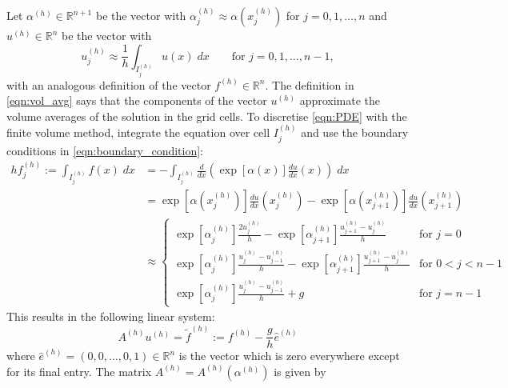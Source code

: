\documentclass[11pt]{article}
\begin{document}
Let $\alpha^{(h)}\in\mathbb{R}^{n+1}$ be the vector with $\alpha^{(h)}_j\approx \alpha(x^{(h)}_j)$ for $j=0,1,\dots,n$ and $u^{(h)}\in\mathbb{R}^{n}$ be the vector with
\begin{equation}
    u^{(h)}_j\approx \frac{1}{h}\int_{I^{(h)}_j} u(x)\; dx\qquad\text{for $j=0,1,\dots,n-1$},\label{eqn:vol_avg}
\end{equation}
with an analogous definition of the vector $f^{(h)}\in \mathbb{R}^n$. The definition in \eqref{eqn:vol_avg} says that the components of the vector $u^{(h)}$ approximate the volume averages of the solution in the grid cells. To discretise \eqref{eqn:PDE} with the finite volume method, integrate the equation over cell $I_j^{(h)}$ and use the boundary conditions in \eqref{eqn:boundary_condition}:
\begin{equation}
    \begin{aligned}
       hf^{(h)}_j :=\int_{I^{(h)}_j} f(x)\;dx&=
    -\int_{I^{(h)}_j} \frac{d}{dx}\left(\exp[\alpha(x)]\frac{du}{dx}(x)\right)\;dx \\
    &=\exp[\alpha(x^{(h)}_{j})]\frac{du}{dx}(x^{(h)}_{j})-\exp[\alpha(x^{(h)}_{j+1})]\frac{du}{dx}(x^{(h)}_{j+1})\\
    &\approx \begin{cases}
        \exp[\alpha^{(h)}_{j}]\frac{2u^{(h)}_j}{h}-\exp[\alpha^{(h)}_{j+1}]\frac{u^{(h)}_{j+1}-u^{(h)}_j}{h}&\text{for $j=0$}\\
        \exp[\alpha^{(h)}_{j}]\frac{u^{(h)}_j-u^{(h)}_{j-1}}{h}-\exp[\alpha^{(h)}_{j+1}]\frac{u^{(h)}_{j+1}-u^{(h)}_j}{h}&\text{for $0<j<n-1$}\\ 
        \exp[\alpha^{(h)}_{j}]\frac{u^{(h)}_j-u^{(h)}_{j-1}}{h}+g&\text{for $j=n-1$}
    \end{cases}
    \end{aligned}  
\end{equation}
This results in the following linear system:
\begin{equation}
A^{(h)} u^{(h)} = \widetilde{f}^{(h)} := f^{(h)}-\frac{g}{h} \widehat{e}^{(h)}\label{eqn:discrete_system}
\end{equation}
where $\widehat{e}^{(h)}=(0,0,\dots,0,1)\in\mathbb{R}^{n}$ is the vector which is zero everywhere except for its final entry. The matrix $A^{(h)} = A^{(h)}(\alpha^{(h)})$ is given by
\end{document}
